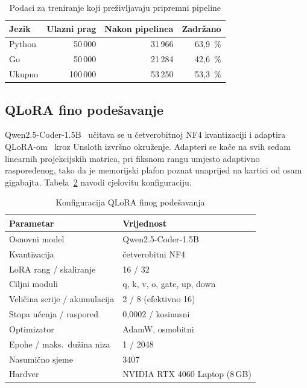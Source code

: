 \documentclass[10pt,conference,a4paper]{IEEEtran}
\begin{document}
\begin{table}[b]
\caption{Podaci za treniranje koji preživljavaju pripremni pipeline}
\label{tab:data}
\centering
\footnotesize
\begin{tabular}{@{}lrrr@{}}
\toprule
\textbf{Jezik} & \textbf{Ulazni prag} & \textbf{Nakon pipelinea} & \textbf{Zadržano}\\
\midrule
Python & 50\,000  & 31\,966 & 63,9~\%\\
Go     & 50\,000  & 21\,284 & 42,6~\%\\
\midrule
Ukupno & 100\,000 & 53\,250 & 53,3~\%\\
\bottomrule
\end{tabular}
\end{table}

\subsection{QLoRA fino podešavanje}
Qwen2.5-Coder-1.5B~\cite{hui2024} učitava se u četverobitnoj NF4 kvantizaciji
i adaptira QLoRA-om~\cite{dettmers2023} kroz Unsloth izvršno okruženje.
Adapteri se kače na svih sedam linearnih projekcijskih matrica, pri fiksnom
rangu umjesto adaptivno raspoređenog, tako da je memorijski plafon poznat
unaprijed na kartici od osam gigabajta. Tabela~\ref{tab:config} navodi
cjelovitu konfiguraciju.

\begin{table}[b]
\caption{Konfiguracija QLoRA finog podešavanja}
\label{tab:config}
\centering
\footnotesize
\begin{tabular}{@{}ll@{}}
\toprule
\textbf{Parametar} & \textbf{Vrijednost}\\
\midrule
Osnovni model             & Qwen2.5-Coder-1.5B\\
Kvantizacija              & četverobitni NF4\\
LoRA rang / skaliranje    & 16 / 32\\
Ciljni moduli             & q, k, v, o, gate, up, down\\
Veličina serije / akumulacija & 2 / 8 (efektivno 16)\\
Stopa učenja / raspored   & 0,0002 / kosinusni\\
Optimizator               & AdamW, osmobitni\\
Epohe / maks.\ dužina niza & 1 / 2048\\
Nasumično sjeme           & 3407\\
Hardver                   & NVIDIA RTX 4060 Laptop (8\,GB)\\
\bottomrule
\end{tabular}
\end{table}
\end{document}
